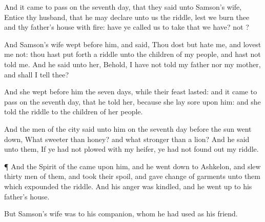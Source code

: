 {And it came to pass on the
seventh
day, that they
said unto
Samson’s
wife,
Entice thy
husband, that he may
declare unto us the
riddle, lest we
burn thee and thy
father’s
house with
fire: have ye
called us to take that we
have?
{} not
{}?

And
Samson’s
wife
wept before him, and
said, Thou dost but
hate me, and
lovest me not: thou hast put
forth a
riddle unto the
children of my
people, and hast not
told
{} me. And he
said unto her, Behold, I have not
told
{} my
father nor my
mother, and shall I
tell
{} thee?

And she
wept before him the
seven
days, while their
feast
lasted: and it came to pass on the
seventh
day, that he
told her, because she lay
sore upon him: and she
told the
riddle to the
children of her
people.

And the
men of the
city
said unto him on the
seventh
day before the
sun went
down, What
{}
sweeter than
honey? and what
{}
stronger than a
lion? And he
said unto them,
If ye had not
plowed with my
heifer, ye had not found
out my
riddle.


\par }{\PP {}¶ And the
Spirit of the
{}
came upon him, and he went
down to
Ashkelon, and
slew
thirty
men of them, and
took their
spoil, and
gave
change of garments unto them which
expounded the
riddle. And his
anger was
kindled, and he went
up to his
father’s
house.

But
Samson’s
wife was
{} to his
companion, whom he had used as his
friend.




\par }
